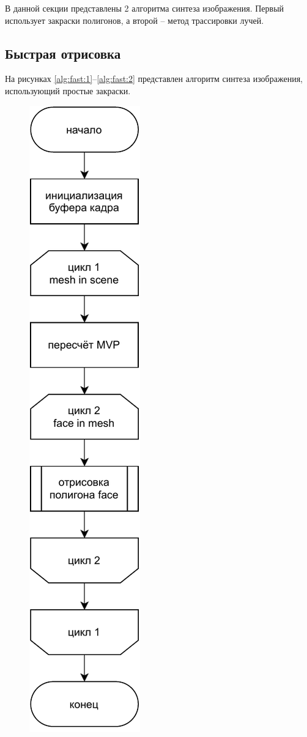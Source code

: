 В данной секции представлены 2 алгоритма синтеза изображения. Первый использует закраски полигонов, а второй -- метод трассировки лучей.

\subsection{Быстрая отрисовка}

На рисунках \ref{alg:fast:1}--\ref{alg:fast:2} представлен алгоритм синтеза изображения, использующий простые закраски.

\begin{figure}
	\centering
	\includegraphics[width=\linewidth,height=0.85\textheight,keepaspectratio]{diagrams/fast.pdf}

\end{figure}

